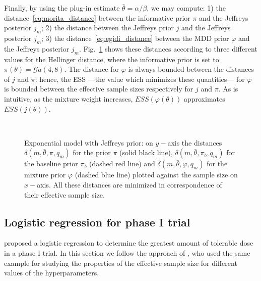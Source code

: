 \documentclass{statsoc}
\begin{document}
Finally, by using the plug-in estimate $\bar{\theta}=\alpha/\beta$, we may compute: 1) the distance~\eqref{eq:morita_distance} between the informative prior $\pi$ and the Jeffreys posterior $j_{m}$; 2) the distance between the Jeffreys prior $j$ and the Jeffreys posterior $j_{m}$; 3) the distance~\eqref{eq:egidi_distance} between the MDD prior $\varphi$ and the Jeffreys posterior $j_{m}$. Fig.~\ref{Jeffreys_esp} shows these distances according to three different values for the Hellinger distance, where the informative prior is set to $\pi(\theta)= \mathcal{G}a(4,8)$. The distance for $\varphi$ is always bounded between the distances of $j$ and $\pi$: hence, the ESS ---the value which minimizes these quantities--- for $\varphi$ is bounded between the effective sample sizes respectively for $j$ and $\pi$. As is intuitive, as the mixture weight increases, $ESS(\varphi(\theta))$ approximates $ESS(j(\theta))$. 

\begin{figure}
\centering
{}~
\\
\caption{Exponential model with Jeffreys prior: on $y-$axis the distances $\delta(m, \bar{\theta}, \pi, q_{m})$ for the prior $\pi$ (solid black line), $\delta(m, \bar{\theta}, \pi_{b}, q_{m})$ for the baseline prior $\pi_{b}$ (dashed red line) and $\delta(m, \bar{\theta}, \varphi, q_{m})$ for the mixture prior $\varphi$ (dashed blue line) plotted against the sample size on $x-$axis. All these distances are minimized in correspondence of their effective sample size.}
\label{Jeffreys_esp}
\end{figure}

\subsection{Logistic regression for phase I trial}

\cite{thall2003practical} proposed a logistic regression to determine the greatest amount of tolerable dose in a phase I trial. In this section we follow the approach of \cite{morita2008determining}, who used the same example for studying the properties of the effective sample size for different values of the hyperparameters. 
\end{document}
